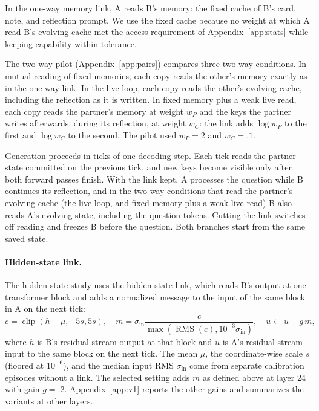 In the one-way memory link, A reads B's memory: the fixed cache of B's
card, note, and reflection prompt. We use the fixed cache because no
weight at which A read B's evolving cache met the access requirement of
Appendix~\ref{app:stats} while keeping capability within tolerance.

The two-way pilot (Appendix~\ref{app:pairs}) compares three two-way
conditions. In mutual reading of fixed memories, each copy reads the
other's memory exactly as in the one-way link. In the live loop, each
copy reads the other's evolving cache, including the reflection as it
is written. In fixed memory plus a weak live read, each copy reads the
partner's memory at weight $w_P$ and the keys the partner writes
afterwards, during its reflection, at weight $w_C$: the link adds
$\log w_P$ to the first and $\log w_C$ to the second. The pilot used
$w_P=2$ and $w_C=.1$.

Generation proceeds in ticks of one decoding step. Each tick reads the partner state committed
on the previous tick, and new keys become visible only after both forward
passes finish. With the link kept, A processes the question while B
continues its reflection, and in the two-way conditions that read the
partner's evolving cache (the live loop, and fixed memory plus a weak
live read) B also reads A's evolving state, including the question
tokens. Cutting the link switches off reading and freezes B
before the question. Both branches start from the same saved state.

\paragraph{Hidden-state link.}
The hidden-state study uses the hidden-state link, which reads B's
output at one transformer block and adds a normalized message to the
input of the same block in A on the next tick:
\begin{equation}
c=\operatorname{clip}(h-\mu,-5s,5s),\quad
m=\sigma_{\mathrm{in}}\frac{c}
{\max(\operatorname{RMS}(c),10^{-3}\sigma_{\mathrm{in}})},\quad
u\leftarrow u+g\,m ,
\end{equation}
where $h$ is B's residual-stream output at that block and $u$ is A's
residual-stream input to the same block on the next tick.
The mean $\mu$, the coordinate-wise scale $s$ (floored at $10^{-6}$), and
the median input RMS $\sigma_{\mathrm{in}}$ come from separate calibration
episodes without a link. The selected setting adds $m$ as defined above
at layer 24 with gain $g=.2$. Appendix~\ref{app:v1} reports the other
gains and summarizes the variants at other layers.

